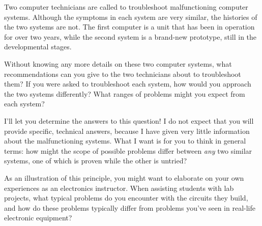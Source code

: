 

Two computer technicians are called to troubleshoot malfunctioning computer systems.  Although the symptoms in each system are very similar, the histories of the two systems are not.  The first computer is a unit that has been in operation for over two years, while the second system is a brand-new prototype, still in the developmental stages.

Without knowing any more details on these two computer systems, what recommendations can you give to the two technicians about to troubleshoot them?  If you were asked to troubleshoot each system, how would you approach the two systems differently?  What ranges of problems might you expect from each system?







I'll let you determine the answers to this question!  I do not expect that you will provide specific, technical answers, because I have given very little information about the malfunctioning systems.  What I want is for you to think in general terms: how might the scope of possible problems differ between {\it any} two similar systems, one of which is proven while the other is untried?







As an illustration of this principle, you might want to elaborate on your own experiences as an electronics instructor.  When assisting students with lab projects, what typical problems do you encounter with the circuits they build, and how do these problems typically differ from problems you've seen in real-life electronic equipment?




